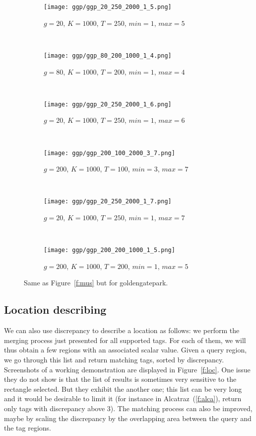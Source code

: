 \begin{figure}
        \centering
        \begin{subfigure}[b]{0.38\textwidth}
                \texttt{[image: ggp/ggp\_20\_250\_2000\_1\_5.png]}
                \caption{$g=20$, $K=1000$, $T=250$, $min=1$, $max=5$}
        \end{subfigure}~
        \begin{subfigure}[b]{0.38\textwidth}
                \texttt{[image: ggp/ggp\_80\_200\_1000\_1\_4.png]}
                \caption{$g=80$, $K=1000$, $T=200$, $min=1$, $max=4$}
        \end{subfigure}~

        \begin{subfigure}[b]{0.38\textwidth}
                \texttt{[image: ggp/ggp\_20\_250\_2000\_1\_6.png]}
                \caption{$g=20$, $K=1000$, $T=250$, $min=1$, $max=6$}
        \end{subfigure}~
        \begin{subfigure}[b]{0.38\textwidth}
                \texttt{[image: ggp/ggp\_200\_100\_2000\_3\_7.png]}
                \caption{$g=200$, $K=1000$, $T=100$, $min=3$, $max=7$}
        \end{subfigure}~

        \begin{subfigure}[b]{0.38\textwidth}
                \texttt{[image: ggp/ggp\_20\_250\_2000\_1\_7.png]}
                \caption{$g=20$, $K=1000$, $T=250$, $min=1$, $max=7$}
        \end{subfigure}~
        \begin{subfigure}[b]{0.38\textwidth}
                \texttt{[image: ggp/ggp\_200\_200\_1000\_1\_5.png]}
                \caption{$g=200$, $K=1000$, $T=200$, $min=1$, $max=5$}
        \end{subfigure}
		\caption{Same as Figure~\ref{f:mus} but for
		\textsf{goldengatepark}.\label{f:ggp}}
\end{figure}
\restoregeometry

\subsection{Location describing}

We can also use discrepancy to describe a location as follows: we perform the
merging process just presented for all supported tags. For each of them, we
will thus obtain a few regions with an associated scalar value. Given a query
region, we go through this list and return matching tags, sorted by
discrepancy. Screenshots of a working demonstration are displayed in
Figure~\vref{f:loc}. One issue they do not show is that the list of results is
sometimes very sensitive to the rectangle selected. But they exhibit the
another one; this list can be very long and it would be desirable to limit it
(for instance in Alcatraz~(\ref{f:alca}), return only tags with discrepancy
above $3$). The matching process can also be improved, maybe by scaling the
discrepancy by the overlapping area between the query and the tag regions.

